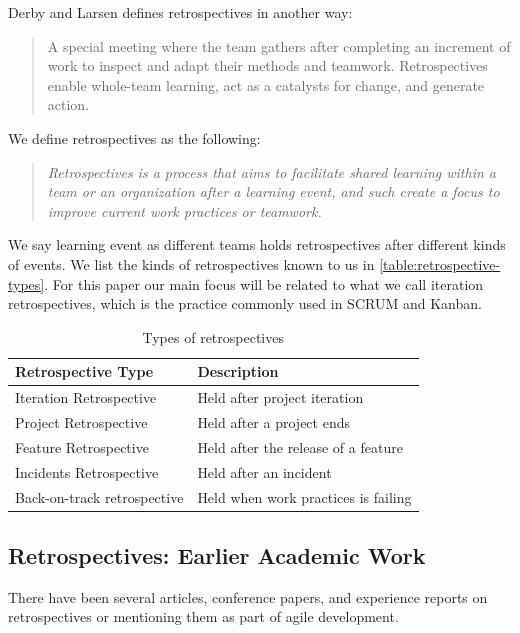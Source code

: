 Derby and Larsen \cite{Larsen2006} defines retrospectives in another way: 

\begin{quote}
A special meeting where the team gathers after completing an increment of work to inspect and adapt their methods and teamwork. Retrospectives enable whole-team learning, act as a catalysts for change, and generate action.
\end{quote}

We define retrospectives as the following:

\begin{quote}
	\textit{Retrospectives is a process that aims to facilitate shared learning within a team or an organization after a learning event, and such create a focus to improve current work practices or teamwork.}
\end{quote}

We say learning event as different teams holds retrospectives after different kinds of events. We list the kinds of retrospectives known to us in \autoref{table:retrospective-types}. For this paper our main focus will be related to what we call iteration retrospectives, which is the practice commonly used in SCRUM and Kanban. 

\begin{table}[!h]
	\begin{center}
		\caption{Types of retrospectives}
		\label{table:retrospective-types}
		\begin{tabular}{l l}
			\hline
			Retrospective Type & Description \\
			\hline
			Iteration Retrospective & Held after project iteration \\
			Project Retrospective & Held after a project ends \\
			Feature Retrospective & Held after the release of a feature \\
			Incidents Retrospective & Held after an incident \\
			Back-on-track retrospective & Held when work practices is failing \\
			\hline
		\end{tabular}
	\end{center}
\end{table}

\subsection{Retrospectives: Earlier Academic Work}
There have been several articles, conference papers, and experience reports on retrospectives or mentioning them as part of agile development.

